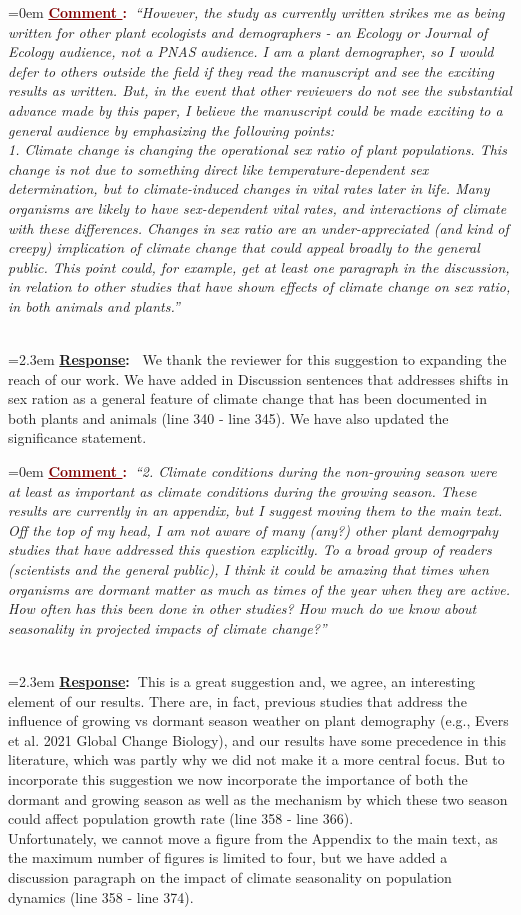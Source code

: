 \documentclass[12pt]{article}
\newcounter{cN}
\newcommand{\comment}[1]{
	\vspace{2em}
	\refstepcounter{cN} %
	\noindent \hangindent=0em \textbf{\textcolor{Maroon}{\uline{Comment \thecN}:~}}\emph{``#1''}
	}
\newcommand{\response}[1]{
	\\[0.25em]
	\hangindent=2.3em \textbf{\textcolor{NavyBlue}{\uline{Response}:~}}#1
	}
\begin{document}
\comment{However, the study as currently written strikes me as being written for other plant ecologists and demographers - an Ecology or Journal of Ecology audience, not a PNAS audience. I am a plant demographer, so I would defer to others outside the field if they read the manuscript and see the exciting results as written. But, in the event that other reviewers do not see the substantial advance made by this paper, I believe the manuscript could be made exciting to a general audience by emphasizing the following points:
\\
1. Climate change is changing the operational sex ratio of plant populations. This change is not due to something direct like temperature-dependent sex determination, but to climate-induced changes in vital rates later in life. Many organisms are likely to have sex-dependent vital rates, and interactions of climate with these differences. Changes in sex ratio are an under-appreciated (and kind of creepy) implication of climate change that could appeal broadly to the general public. This point could, for example, get at least one paragraph in the discussion, in relation to other studies that have shown effects of climate change on sex ratio, in both animals and plants.}
\response{ We thank the reviewer for this suggestion to expanding the reach of our work. We have added in Discussion sentences that addresses shifts in sex ration as a general feature of climate change that has been documented in both plants and animals (line 340 - line 345).
We have also updated the significance statement.}

\comment{2. Climate conditions during the non-growing season were at least as important as climate conditions during the growing season. These results are currently in an appendix, but I suggest moving them to the main text. Off the top of my head, I am not aware of many (any?) other plant demogrpahy studies that have addressed this question explicitly. To a broad group of readers (scientists and the general public), I think it could be amazing that times when organisms are dormant matter as much as times of the year when they are active. How often has this been done in other studies? How much do we know about seasonality in projected impacts of climate change?}
\response{This is a great suggestion and, we agree, an interesting element of our results. There are, in fact, previous studies that address the influence of growing vs dormant season weather on plant demography (e.g., Evers et al. 2021 Global Change Biology), and our results have some precedence in this literature, which was partly why we did not make it a more central focus. 
But to incorporate this suggestion we now incorporate the importance of both the dormant and growing season as well as the mechanism by which these two season could affect population growth rate (line 358 - line 366). 
\\
Unfortunately, we cannot move a figure from the Appendix to the main text, as the maximum number of figures is limited to four, but we have added a discussion paragraph on the impact of climate seasonality on population dynamics (line 358 - line 374).}
\end{document}
